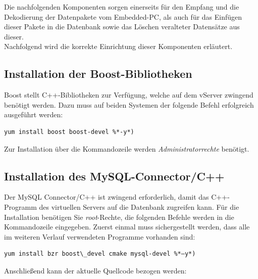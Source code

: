 \documentclass[fontsize = 12pt, paper = a4]{scrreprt}
\begin{document}

Die nachfolgenden Komponenten sorgen einerseits für den Empfang und die Dekodierung der Datenpakete vom Embedded-PC, als auch für das Einfügen dieser Pakete in die Datenbank sowie das Löschen veralteter Datensätze aus dieser. \\
Nachfolgend wird die korrekte Einrichtung dieser Komponenten erläutert.

\subsection{Installation der Boost-Bibliotheken}

Boost stellt C++-Bibliotheken zur Verfügung, welche auf dem vServer zwingend benötigt werden.
Dazu muss auf beiden Systemen der folgende Befehl erfolgreich ausgeführt werden:

\vspace*{4mm}
\begin{lstlisting}[frame=single]
yum install boost boost-devel %*-y*)
\end{lstlisting} 
\vspace*{-2mm}
    
    
Zur Installation über die Kommandozeile werden \textit{Administratorrechte} benötigt.

\subsection{Installation des MySQL-Connector/C++}

Der MySQL Connector/C++ ist zwingend erforderlich, damit das C++-Programm des virtuellen Servers auf die Datenbank zugreifen kann. Für die Installation benötigen Sie \textit{root}-Rechte, die folgenden Befehle werden in die Kommandozeile eingegeben.
Zuerst einmal muss sichergestellt werden, dass alle im weiteren Verlauf verwendeten Programme vorhanden sind:

\vspace*{4mm}
\begin{lstlisting}[frame=single]
yum install bzr boost\_devel cmake mysql-devel %*–y*)
\end{lstlisting} 
\vspace*{-2mm}

Anschließend kann der aktuelle Quellcode bezogen werden:

\vspace*{4mm}
\begin{lstlisting}[frame=single]
%*bzr branch lp:~mysql/mysql-connector-cpp/trunk ./mysql-connector-cpp*) 
\end{lstlisting} 
\vspace*{-2mm}
\end{document}
